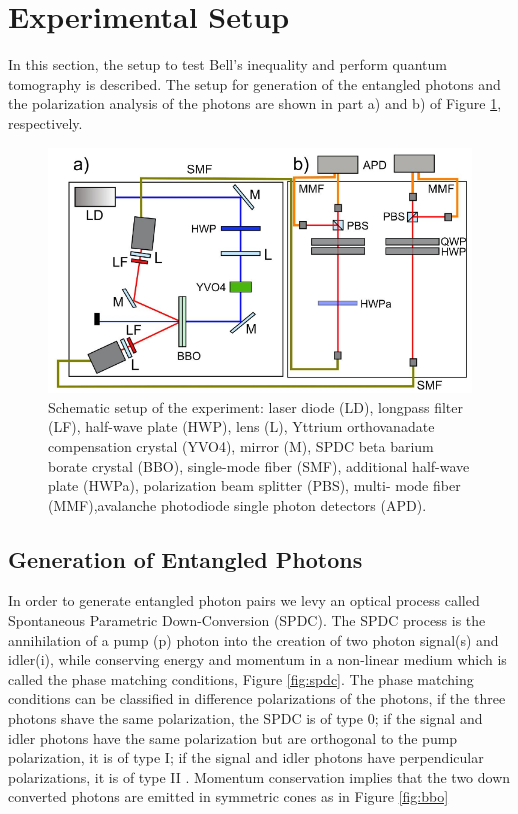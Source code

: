 \section{Experimental Setup}\label{Experimental Setup}
In this section, the setup to test Bell's inequality and perform quantum tomography is described. The setup for generation of the entangled photons and the polarization analysis of the photons are shown in part a) and b) of Figure \ref{fig:setup}, respectively.




\begin{figure}[htp]
    \centering
    \includegraphics[scale = 0.8]{figures/setup.png}
    \caption{Schematic setup of the experiment:  laser diode (LD), longpass filter (LF), half-wave plate (HWP), lens
(L), Yttrium orthovanadate compensation crystal (YVO4), mirror (M), SPDC beta barium borate crystal (BBO), single-mode fiber
(SMF), additional half-wave plate (HWPa), polarization beam splitter (PBS), multi-
mode fiber (MMF),avalanche photodiode single photon detectors (APD).}
    \label{fig:setup}
\end{figure}


\subsection{Generation of Entangled Photons}

In order to generate entangled photon pairs we levy an optical process called Spontaneous Parametric Down-Conversion (SPDC). The SPDC process is the annihilation of a pump (p) photon into the creation of two photon signal(s) and idler(i), while conserving energy and momentum in a non-linear medium which is called the phase matching conditions, Figure \ref{fig:spdc}. The phase matching conditions can be classified in difference polarizations of the photons, if the three photons shave the same polarization, the SPDC is of type 0; if the signal and idler photons have the same polarization but are orthogonal to the pump polarization, it is of type I; if the signal and idler photons have perpendicular polarizations, it is of type II \cite{zhang2021spdc}. Momentum conservation implies that the two down converted photons are emitted in symmetric cones as in Figure \ref{fig:bbo}

